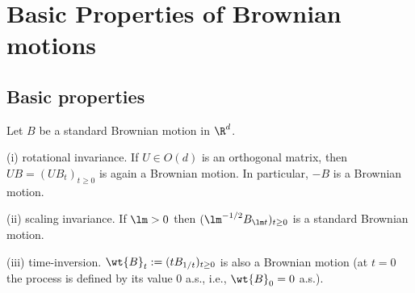 \section{Basic Properties of Brownian motions}

\subsection{Basic properties}

\begin{proposition}\label{pro:brownian_motion_basic_properties}
Let $B$ be a standard Brownian motion in $\R^d$.
\ben
\item [(i)] rotational invariance. If $U \in O(d)$ is an orthogonal matrix, then $UB = (UB_t)_{t \geq 0}$ is again a Brownian motion. In particular, $-B$ is a Brownian motion.
\item [(ii)] scaling invariance. If $\lm > 0$ then $(\lm^{-1/2} B_{\lm t})_{t \geq 0}$ is a standard Brownian motion.
\item [(iii)] time-inversion. $\wt{B}_t := (tB_{1/t})_{t \geq 0}$ is also a Brownian motion (at $t = 0$ the process is defined by its value 0 a.s., i.e., $\wt{B}_0 = 0$ a.s.).
\een
\end{proposition}

